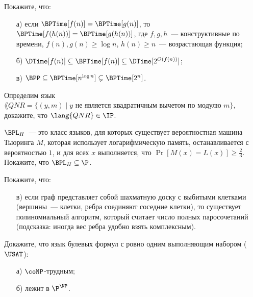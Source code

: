 \begin{ptask}{44}
    Покажите, что:
	\begin{enumerate}[topsep = 0pt, itemsep = -1ex]
        \item [а)] если $\BPTime[f(n)] = \BPTime[g(n)]$, то $\BPTime[f(h(n))] = \BPTime[g(h(n))]$, где $f, g, h$~---
			конструктивные по времени, $f(n), g(n) \ge \log n$, $h(n) \ge n$~--- возрастающая функция;
        \item [б)] $\DTime[f(n)] \subseteq \BPTime[f(n)] \subseteq \DTime[2^{O(f(n))}]$;
        \item [в)] $\BPP \subseteq \BPTime[n^{\log n}] \subsetneq \BPTime[2^n]$.
    \end{enumerate}
\end{ptask}

\begin{ptask}{45}
    Определим язык $\lang{QNR} = \{(y, m) \mid \text{$y$ не является квадратичным вычетом по модулю $m$}\}$, докажите, что
    $\lang{QNR} \in \IP$.
\end{ptask}

\begin{ptask}{46}
    $\BPL_H$~--- это класс языков, для которых существует вероятностная машина Тьюринга $M$, которая использует логарифмическую
    память, останавливается с вероятностью $1$, и для всех $x$ выполняется, что $\Pr[M(x) = L(x)] \ge \frac{2}{3}$. Покажите, что
    $\BPL_H \subseteq \P$.
\end{ptask}

\begin{ptask}{49}
    Покажите, что:
    \begin{enumerate}[topsep = 0pt, itemsep = -1ex]
        \item [в)] если граф представляет собой шахматную доску с выбитыми клетками
            (вершины~--- клетки, ребра соединяют соседние клетки), то существует
            полиномиальный алгоритм, который считает число полных паросочетаний
            (подсказка: иногда вес ребра удобно взять комплексным).
    \end{enumerate}
\end{ptask}


\begin{ptask}{53}
    Докажите, что язык булевых формул с ровно одним выполняющим набором ($\USAT$):
    \begin{enumerate}[topsep = 0pt, itemsep = -1ex]
        \item [а)] $\coNP$-трудным;
        \item [б)] лежит в $\P^{\NP}$.
    \end{enumerate}
\end{ptask}

